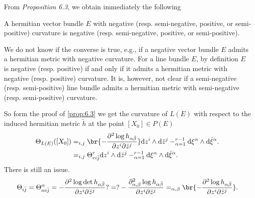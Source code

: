 \documentclass[lang=en,12pt]{beautybook}
\begin{document}
From \textit{Proposition 6.3}, we obtain immediately the following
\begin{theorem}
  A hermitian vector bundle $E$ with negative (resp. semi-negative, positive, or semi-positive) curvature is negative (resp. semi-negative, positive, or semi-positive).
\end{theorem}

We do not know if the converse is true, e.g., if a negative vector bundle $E$ admits a hermitian metric with negative curvature. For a line bundle $E$, by definition $E$ is negative (resp. positive) if and only if it admits a hermitian metric with negative (resp. positive) curvature. It is, however, not clear if a semi-negative (resp. semi-positive) line bundle admits a hermitian metric with semi-negative (resp. semi-positive) curvature.

So form the proof of \autoref{prop:6.3} we get the curvature of $L(E)$ with respect to the induced hermitian metric $\tilde{h}$ at the point $[X_0]\in P(E)$
\begin{align*}
  \Theta_{L(E)}([X_0]) & =\sum_{i,j} \br{-\dfrac{\partial^2 \log h_{\alpha \bar{\beta}}}{\partial z^i \partial \bar{z}^j} }\dd z^i\wedge \dd \bar{z}^j-\sum_{\alpha=1}^{r-1}\dd \xi^\alpha\wedge\dd \bar{\xi}^\alpha. \\
                       & =\sum_{i,j} \Theta_{ri\bar{j}}^r \dd z^i\wedge \dd \bar{z}^j-\sum_{\alpha=1}^{r-1}\dd \xi^\alpha\wedge\dd \bar{\xi}^\alpha.
\end{align*}
There is still an issue.
\begin{align*}
  \Theta_{i\bar{j}} =\sum \Theta^\alpha_{\alpha i\bar{j}} =-\dfrac{\partial^2\log \det h_{\alpha\bar{\beta}}}{\partial z^i \partial\bar{z}^j}
  ?=?-\dfrac{\partial^2 \sum_{\alpha,\beta}\log h_{\alpha\bar{\beta}}}{\partial z^i \partial\bar{z}^j}
  =\sum_{\alpha,\beta} \br{-\dfrac{\partial^2 \log h_{\alpha\bar{\beta}}}{\partial z^i \partial\bar{z}^j}}.
\end{align*}
\end{document}
